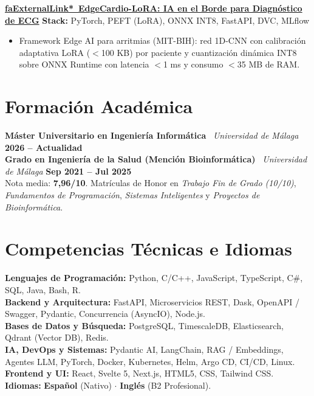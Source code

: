 \documentclass[a4paper,10pt]{article}
\begin{document}
\vspace{4.5pt}

\noindent\textbf{\href{https://diegodepablo.is-a.dev/projects/edgecardio-lora}{\csname faExternalLink*\endcsname\ EdgeCardio-LoRA: IA en el Borde para Diagnóstico de ECG}} \hfill {\scriptsize\color{subtext}\textbf{Stack:} PyTorch, PEFT (LoRA), ONNX INT8, FastAPI, DVC, MLflow}
\begin{itemize}
  \item Framework Edge AI para arritmias (MIT-BIH): red 1D-CNN con calibración adaptativa LoRA ($<$100 KB) por paciente y cuantización dinámica INT8 sobre ONNX Runtime con latencia $<$1 ms y consumo $<$35 MB de RAM.
\end{itemize}

\section*{Formación Académica}

\noindent\textbf{Máster Universitario en Ingeniería Informática} \textbar\ \textit{Universidad de Málaga} \hfill {\footnotesize\color{subtext}\textbf{2026 -- Actualidad}} \\[2.5pt]
\noindent\textbf{Grado en Ingeniería de la Salud (Mención Bioinformática)} \textbar\ \textit{Universidad de Málaga} \hfill {\footnotesize\color{subtext}\textbf{Sep 2021 -- Jul 2025}} \\
{\footnotesize Nota media: \textbf{7,96/10}. Matrículas de Honor en \textit{Trabajo Fin de Grado (10/10)}, \textit{Fundamentos de Programación}, \textit{Sistemas Inteligentes} y \textit{Proyectos de Bioinformática}.}

\section*{Competencias Técnicas e Idiomas}

{\footnotesize
\noindent\textbf{Lenguajes de Programación:} Python, C/C++, JavaScript, TypeScript, C\#, SQL, Java, Bash, R. \\[2.5pt]
\textbf{Backend y Arquitectura:} FastAPI, Microservicios REST, Dask, OpenAPI / Swagger, Pydantic, Concurrencia (AsyncIO), Node.js. \\[2.5pt]
\textbf{Bases de Datos y Búsqueda:} PostgreSQL, TimescaleDB, Elasticsearch, Qdrant (Vector DB), Redis. \\[2.5pt]
\textbf{IA, DevOps y Sistemas:} Pydantic AI, LangChain, RAG / Embeddings, Agentes LLM, PyTorch, Docker, Kubernetes, Helm, Argo CD, CI/CD, Linux. \\[2.5pt]
\textbf{Frontend y UI:} React, Svelte 5, Next.js, HTML5, CSS, Tailwind CSS. \hfill \textbf{Idiomas:} \textbf{Español} (Nativo) \enskip $\cdot$ \enskip \textbf{Inglés} (B2 Profesional).
}
\end{document}
